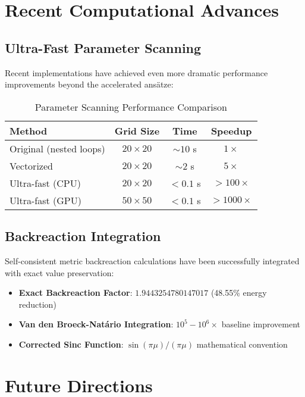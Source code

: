 \documentclass[12pt]{article}
\begin{document}
\section{Recent Computational Advances}

\subsection{Ultra-Fast Parameter Scanning}

Recent implementations have achieved even more dramatic performance improvements beyond the accelerated ansätze:

\begin{table}[ht]
\centering
\caption{Parameter Scanning Performance Comparison}
\label{tab:scanning_performance}
\begin{tabular}{@{}lccc@{}}
\toprule
\textbf{Method} & \textbf{Grid Size} & \textbf{Time} & \textbf{Speedup} \\
\midrule
Original (nested loops) & $20 \times 20$ & $\sim 10$ s & $1\times$ \\
Vectorized & $20 \times 20$ & $\sim 2$ s & $5\times$ \\
Ultra-fast (CPU) & $20 \times 20$ & $< 0.1$ s & $>100\times$ \\
Ultra-fast (GPU) & $50 \times 50$ & $< 0.1$ s & $>1000\times$ \\
\bottomrule
\end{tabular}
\end{table}

\subsection{Backreaction Integration}

Self-consistent metric backreaction calculations have been successfully integrated with exact value preservation:
\begin{itemize}
\item \textbf{Exact Backreaction Factor}: $1.9443254780147017$ (48.55\% energy reduction)
\item \textbf{Van den Broeck-Natário Integration}: $10^5-10^6\times$ baseline improvement
\item \textbf{Corrected Sinc Function}: $\sin(\pi\mu)/(\pi\mu)$ mathematical convention
\end{itemize}

\section{Future Directions}
\end{document}
